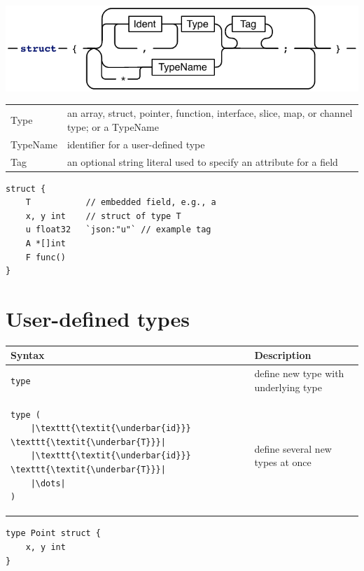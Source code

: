 \documentclass{article}
\newcommand{\var}[1]{\texttt{\textit{\underbar{#1}}}}
\begin{document}
\begin{multicols*}{3}
  \includegraphics[width=\linewidth]{struct}

  \begin{tabular}{p{0.45in}p{2.55in}}
  Type &  an array, struct, pointer, function, interface, slice, map, or channel type; or a TypeName \\
  TypeName &  identifier for a user-defined type \\
  Tag &  an optional string literal used to specify an attribute for a field \\
  \end{tabular}

  \vspace{\baselineskip}

\begin{lstlisting}[frame=single]
struct {
    T           // embedded field, e.g., a
    x, y int    // struct of type T
    u float32   `json:"u"` // example tag
    A *[]int
    F func()
}
\end{lstlisting}

  \filbreak
  \section*{User-defined types}

  \begin{tabular}{p{0.75in}p{2.25in}}
    \toprule
    \textbf{Syntax} & \textbf{Description} \\
    \midrule
    \lstinline!type!\texttt{ \var{id} \var{T}} & define new type \var{id} with underlying type \var{T} \\
    \midrule
    \begin{minipage}{0.7in}
\begin{lstlisting}[escapechar=|]
type (
    |\var{id} \var{T}|
    |\var{id} \var{T}|
    |\dots|
)
\end{lstlisting}
    \end{minipage}
                    & define several new types at once\\
    \bottomrule
  \end{tabular}

  \vspace{\baselineskip}
\begin{lstlisting}[frame=single]
type Point struct {
    x, y int
}


\end{lstlisting}
\end{multicols*}
\end{document}
